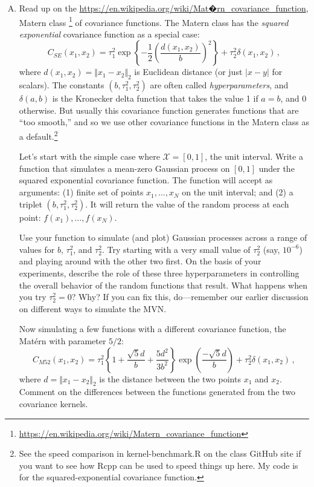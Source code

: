 \documentclass[11pt]{article}
\begin{document}
\begin{enumerate}[(A)]
\item   Read up on the \url{https://en.wikipedia.org/wiki/Mat�rn_covariance_function}, Matern class \footnote{\url{https://en.wikipedia.org/wiki/Matern_covariance_function}} 
of covariance functions.  The Matern class has the \textit{squared exponential} covariance function as a special case:
$$
C_{SE}(x_1, x_2) = \tau_1^2 \exp \left\{ - \frac{1}{2} \left( \frac{d(x_1, x_2)}{b} \right)^2 \right\} + \tau^2_2 \delta(x_1, x_2) \, ,
$$
where $d(x_1, x_2) = \Vert x_1 - x_2 \Vert_2$ is Euclidean distance (or just $|x-y|$ for scalars).  The constants $(b, \tau^2_1, \tau^2_2)$ are often called \textit{hyperparameters}, and $\delta(a,b)$ is the Kronecker delta function that takes the value 1 if $a=b$, and 0 otherwise.  But usually this covariance function generates functions that are ``too smooth,'' and so we use other covariance functions in the Matern class as a default.\footnote{See the speed comparison in kernel-benchmark.R on the class GitHub site if you want to see how Rcpp can be used to speed things up here.  My code is for the squared-exponential covariance function.}

Let's start with the simple case where $\mathcal{X} = [0,1]$, the unit interval.  Write a function that simulates a mean-zero Gaussian process on $[0,1]$ under the squared exponential covariance function.  The function will accept as arguments: (1) finite set of points $x_1, \ldots, x_N$ on the unit interval; and (2) a triplet $(b, \tau^2_1, \tau^2_2)$. It will return the value of the random process at each point: $f(x_1), \ldots, f(x_N)$.

Use your function to simulate (and plot) Gaussian processes across a range of values for $b$, $\tau^2_1$, and $\tau^2_2$.  Try starting with a very small value of $\tau^2_2$ (say, $10^{-6}$) and playing around with the other two first.  On the basis of your experiments, describe the role of these three hyperparameters in controlling the overall behavior of the random functions that result.  What happens when you try $\tau^2_2 = 0$? Why?  If you can fix this, do---remember our earlier discussion on different ways to simulate the MVN.

Now simulating a few functions with a different covariance function, the Mat\'ern with parameter $5/2$:
$$
C_{M52}(x_1, x_2) = \tau_1^2 \left\{ 1 + \frac{\sqrt{5}d}{b} + \frac{5d^2}{3b^2} \right\} \exp\left( \frac{-\sqrt{5}d}{b} \right) + \tau^2_2 \delta(x_1, x_2) \, ,
$$
where $d = \Vert x_1 - x_2 \Vert_2$ is the distance between the two points $x_1$ and $x_2$.  Comment on the differences between the functions generated from the two covariance kernels.


\end{enumerate}
\end{document}
